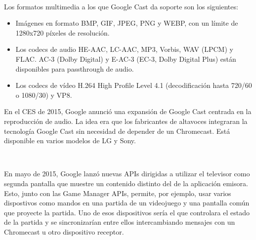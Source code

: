 \

Los formatos multimedia a los que Google Cast da soporte son los siguientes:

\begin{itemize}

	\item Imágenes en formato BMP, GIF, JPEG, PNG y WEBP, con un límite de 1280x720 píxeles de resolución.

	\item Los codecs de audio HE-AAC, LC-AAC, MP3, Vorbis, WAV (LPCM) y FLAC. AC-3 (Dolby Digital) y E-AC-3 (EC-3, Dolby Digital Plus) están disponibles para passthrough de audio.

	\item Los codecs de vídeo H.264 High Profile Level 4.1 (decodificación hasta 720/60 o 1080/30) y VP8.

\end{itemize}

En el CES de 2015, Google anunció una expansión de Google Cast centrada en la reproducción de audio.
La idea era que los fabricantes de altavoces integraran la tecnología Google Cast sin necesidad de depender de un Chromecast.
Está disponible en varios modelos de LG y Sony.

\

En mayo de 2015, Google lanzó nuevas APIs dirigidas a utilizar el televisor como segunda pantalla que muestre un contenido distinto del de la aplicación emisora.
Esto, junto con las Game Manager APIs, permite, por ejemplo, usar varios dispostivos como mandos en una partida de un videojuego y una pantalla común que proyecte la partida.
Uno de esos dispositivos sería el que controlara el estado de la partida y se sincronizarían entre ellos intercambiando mensajes con un Chromecast u otro dispositivo receptor.

